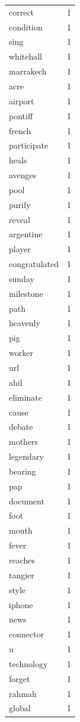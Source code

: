 \begin{tabular}{lr}
correct & 1 \\
condition & 1 \\
sing & 1 \\
whitehall & 1 \\
marrakech & 1 \\
acre & 1 \\
airport & 1 \\
pontiff & 1 \\
french & 1 \\
participate & 1 \\
heals & 1 \\
avenges & 1 \\
pool & 1 \\
purify & 1 \\
reveal & 1 \\
argentine & 1 \\
player & 1 \\
congratulated & 1 \\
sunday & 1 \\
milestone & 1 \\
path & 1 \\
heavenly & 1 \\
pig & 1 \\
worker & 1 \\
url & 1 \\
ahil & 1 \\
eliminate & 1 \\
cause & 1 \\
debate & 1 \\
mothers & 1 \\
legendary & 1 \\
bearing & 1 \\
pap & 1 \\
document & 1 \\
foot & 1 \\
mouth & 1 \\
fever & 1 \\
reaches & 1 \\
tangier & 1 \\
style & 1 \\
iphone & 1 \\
news & 1 \\
connector & 1 \\
u & 1 \\
technology & 1 \\
forget & 1 \\
rahmah & 1 \\
global & 1 \\

\end{tabular}
